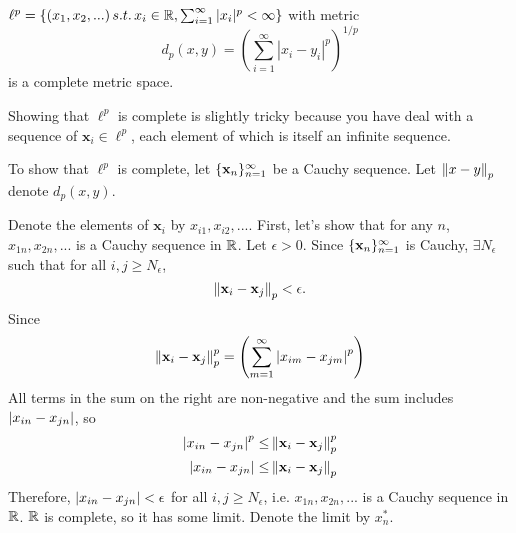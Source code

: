 \begin{example}
  $\ell^p = \{ (x_1, x_2, ...)\, s.t.\, x_i \in \mathbb{R}, \sum_{i=1}^\infty |x_i|^p <
  \infty \}$ with metric
  \[ d_p(x,y) = \left( \sum_{i=1}^\infty |x_i - y_i|^p \right)^{1/p} \]
  is a complete metric space. 
    
  Showing that $\ell^p$ is complete is slightly tricky because you
  have deal with a sequence of $\mathbf{x}_i \in \ell^p$, each element
  of which is itself an infinite sequence. 
  
  To show that $\ell^p$ is complete, let $\{{\mathbf{x}}_n \}_{n=1}^\infty$ be a
  Cauchy sequence. Let $\left\Vert {x-y} \right\Vert_p$ denote $d_p(x,y)$.

  Denote the elements of $\mathbf{x}_i$ by $x_{i1},
  x_{i2}, ... $. First, let's show that for any $n$, $x_{1n}, x_{2n},
  ... $ is a Cauchy sequence in $\mathbb{R}$. Let $\epsilon > 0$. Since
  $\{{\mathbf{x}}_n \}_{n=1}^\infty$ is Cauchy, $\exists N_\epsilon$ such that for all $i,j
  \geq N_\epsilon$, 
  \[  \left\Vert {\mathbf{x}_i - \mathbf{x}_j } \right\Vert_p < \epsilon. \]
  Since 
  \[ \left\Vert {\mathbf{x}_i - \mathbf{x}_j } \right\Vert_p^p = \left( \sum_{m=1}^\infty
    \left\vert {x_{i m} - x_{j m}} \right\vert^p \right) \]
  All terms in the sum on the right are non-negative and the sum
  includes $\left\vert {x_{i n} - x_{jn}} \right\vert$, so 
  \begin{align*} \left\vert {x_{i n} - x_{j n} } \right\vert^p \leq & \left\Vert {\mathbf{x}_i -
      \mathbf{x}_j } \right\Vert_p^p \\
    \left\vert {x_{i n} - x_{j n} } \right\vert \leq & 
    \left\Vert {\mathbf{x}_i - \mathbf{x}_j } \right\Vert_p  
  \end{align*}
  Therefore, $\left\vert {x_{i n} - x_{j n}} \right\vert < \epsilon$ for all $i,j \geq
  N_\epsilon$, i.e. $x_{1n}, x_{2n}, ...$ is a Cauchy sequence in
  $\mathbb{R}$. $\mathbb{R}$ is complete, so it has some limit. Denote the limit by
  $x^\ast_n$.  


\end{example}
